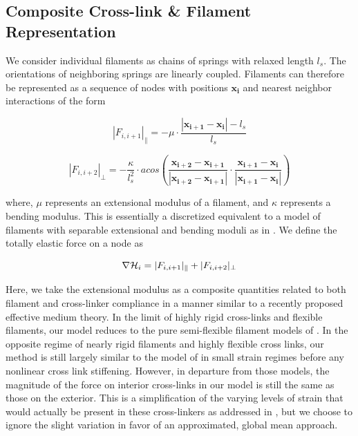 \documentclass[pre,preprint]{revtex4-1}
\begin{document}
\subsection{Composite Cross-link \& Filament Representation}
We consider individual filaments as chains of springs with relaxed length $l_s$.  The orientations of neighboring springs are linearly coupled. Filaments can therefore be represented as a sequence of nodes with positions $\mathbf{x_i}$ and nearest neighbor interactions of the form

\begin{equation}
|F_{i,i+1}|_{\parallel} = -\mu\cdot\frac{|\mathbf{x_{i+1}}-\mathbf{x_i}|-l_s}{l_s} 
\end{equation}

\begin{equation}
|F_{i,i+2}|_{\perp} = -\frac{\kappa}{l_s^2}\cdot acos\left (\frac{\mathbf{x_{i+2}}-\mathbf{x_{i+1}}}{|\mathbf{x_{i+2}}-\mathbf{x_{i+1}}|} \cdot\frac{\mathbf{x_{i+1}}-\mathbf{x_i}}{|\mathbf{x_{i+1}}-\mathbf{x_i}|} \right ) 
\end{equation}


where, $\mu$ represents an extensional modulus of a filament, and $\kappa$ represents a bending modulus.   This is essentially a discretized equivalent to a model of filaments with separable extensional and bending moduli as in \cite{theo_hlm}.  We define the totally elastic force on a node as

\begin{equation}
\nabla{\cal H}_i =|F_{i,i+1}|_{\parallel} + |F_{i,i+2}|_{\perp}
\end{equation}

Here, we take the extensional modulus as a composite quantities related to both filament and cross-linker compliance in a manner similar to a recently proposed effective medium theory\cite{theo_crosslinknonlinear}.  In the limit of highly rigid cross-links and flexible filaments, our model reduces to the pure semi-flexible filament models of \cite{theo_hlm,theo_hlm2}.  In the opposite regime of nearly rigid filaments and highly flexible cross links, our method is still largely similar to the model of \cite{theo_crosslinknonlinear} in small strain regimes before any nonlinear cross link stiffening.  However, in departure from those models, the magnitude of the force on interior cross-links in our model is still the same as those on the exterior.  This is a simplification of the varying levels of strain that would actually be present in these cross-linkers as addressed in \cite{theo_crosslinknonlinear}, but we choose to ignore the slight variation in favor of an approximated, global mean approach.  
\end{document}
